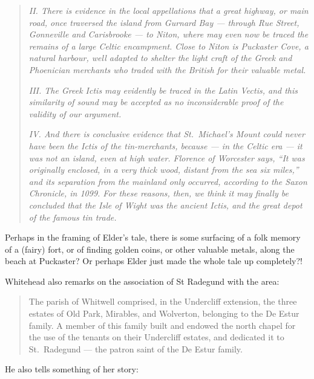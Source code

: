 \documentclass[
  12pt,
  a5paper,
  twoside]{book}
\begin{document}
\begin{quote}
\emph{II. There is evidence in the local appellations that a great
highway, or main road, once traversed the island from Gurnard Bay ---
through Rue Street, Gonneville and Carisbrooke --- to Niton, where may
even now be traced the remains of a large Celtic encampment. Close to
Niton is Puckaster Cove, a natural harbour, well adapted to shelter the
light craft of the Greek and Phoenician merchants who traded with the
British for their valuable metal.}

\emph{III. The Greek Ictis may evidently be traced in the Latin Vectis,
and this similarity of sound may be accepted as no inconsiderable proof
of the validity of our argument.}

\emph{IV. And there is conclusive evidence that St.~Michael's Mount
could never have been the Ictis of the tin-merchants, because --- in the
Celtic era --- it was not an island, even at high water. Florence of
Worcester says, ``It was originally enclosed, in a very thick wood,
distant from the sea six miles,'' and its separation from the mainland
only occurred, according to the Saxon Chronicle, in 1099. For these
reasons, then, we think it may finally be concluded that the Isle of
Wight was the ancient Ictis, and the great depot of the famous tin
trade.}
\end{quote}

Perhaps in the framing of Elder's tale, there is some surfacing of a
folk memory of a (fairy) fort, or of finding golden coins, or other
valuable metals, along the beach at Puckaster? Or perhaps Elder just
made the whole tale up completely?!

Whitehead also remarks on the association of St Radegund with the area:

\begin{quote}
The parish of Whitwell comprised, in the Undercliff extension, the three
estates of Old Park, Mirables, and Wolverton, belonging to the De Estur
family. A member of this family built and endowed the north chapel for
the use of the tenants on their Undercliff estates, and dedicated it to
St.~Radegund --- the patron saint of the De Estur family.
\end{quote}

He also tells something of her story:
\end{document}
